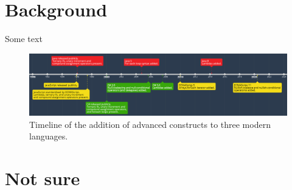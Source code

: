 \documentclass{article}
\begin{document}
\section{Background}
\label{sec:background)}
Some text
\begin{landscape}
    \begin{figure}[htbp]
        \centering
        \vspace{2in}
        \includegraphics[width=1.5\textheight]{timeline}
        \caption{Timeline of the addition of advanced constructs to three modern languages.}
        \label{fig:timeline}
    \end{figure}
\end{landscape}
\section{Not sure}
\label{sec:dunno}   %
\end{document}
